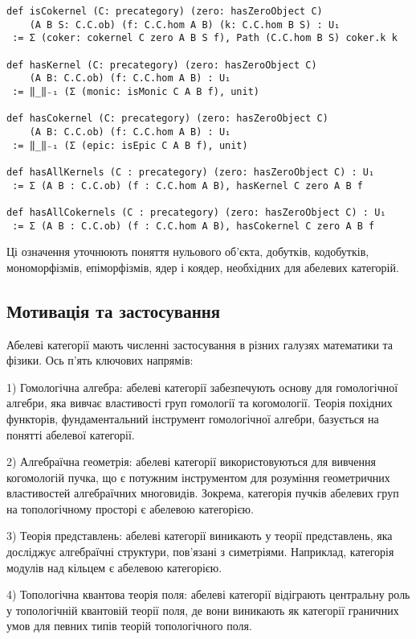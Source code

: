 \documentclass[12pt]{article}
\begin{document}
\begin{lstlisting}
def isCokernel (C: precategory) (zero: hasZeroObject C)
    (A B S: C.C.ob) (f: C.C.hom A B) (k: C.C.hom B S) : U₁
 := Σ (coker: cokernel C zero A B S f), Path (C.C.hom B S) coker.k k

def hasKernel (C: precategory) (zero: hasZeroObject C)
    (A B: C.C.ob) (f: C.C.hom A B) : U₁
 := ‖_‖₋₁ (Σ (monic: isMonic C A B f), unit)

def hasCokernel (C: precategory) (zero: hasZeroObject C)
    (A B: C.C.ob) (f: C.C.hom A B) : U₁
 := ‖_‖₋₁ (Σ (epic: isEpic C A B f), unit)

def hasAllKernels (C : precategory) (zero: hasZeroObject C) : U₁
 := Σ (A B : C.C.ob) (f : C.C.hom A B), hasKernel C zero A B f

def hasAllCokernels (C : precategory) (zero: hasZeroObject C) : U₁
 := Σ (A B : C.C.ob) (f : C.C.hom A B), hasCokernel C zero A B f
\end{lstlisting}

Ці означення уточнюють поняття нульового об’єкта, добутків, кодобутків, мономорфізмів, епіморфізмів, ядер і коядер, необхідних для абелевих категорій.

\subsection{Мотивація та застосування}
Абелеві категорії мають численні застосування в різних галузях математики та фізики. Ось п’ять ключових напрямів:

1) Гомологічна алгебра: абелеві категорії забезпечують основу для гомологічної алгебри, яка вивчає властивості груп гомології та когомології. Теорія похідних функторів, фундаментальний інструмент гомологічної алгебри, базується на понятті абелевої категорії.

2) Алгебраїчна геометрія: абелеві категорії використовуються для вивчення когомологій пучка, що є потужним інструментом для розуміння геометричних властивостей алгебраїчних многовидів. Зокрема, категорія пучків абелевих груп на топологічному просторі є абелевою категорією.

3) Теорія представлень: абелеві категорії виникають у теорії представлень, яка досліджує алгебраїчні структури, пов’язані з симетріями. Наприклад, категорія модулів над кільцем є абелевою категорією.

4) Топологічна квантова теорія поля: абелеві категорії відіграють центральну роль у топологічній квантовій теорії поля, де вони виникають як категорії граничних умов для певних типів теорій топологічного поля.
\end{document}
